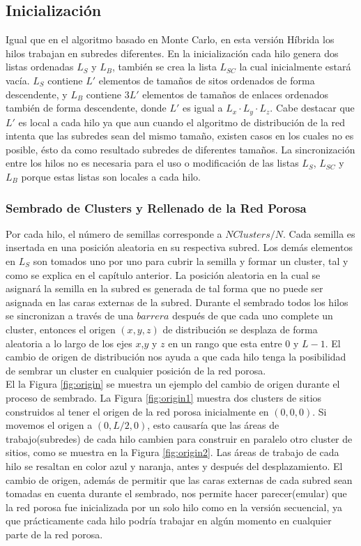 \subsection{Inicialización}
\label{subsec:pinit}
Igual que en el algoritmo basado en Monte Carlo, en esta versión Híbrida los hilos trabajan en subredes diferentes. 
En la inicialización cada hilo genera dos listas ordenadas $L_S$ y $L_B$, también se crea la lista $L_{SC}$ la cual inicialmente estará vacía. 
$L_S$ contiene $L'$ elementos de tamaños de sitos ordenados de forma descendente, y $L_B$ contiene $3L'$ elementos de tamaños de enlaces 
ordenados también de forma descendente, donde $L'$ es igual a $L_x \cdot L_y \cdot L_z$. Cabe destacar que $L'$ es local a cada hilo 
ya que aun cuando el algoritmo de distribución de la red intenta que las subredes sean del mismo tamaño, existen casos en los cuales 
no es posible, ésto da como resultado subredes de diferentes tamaños. La sincronización entre los hilos no es necesaria para 
el uso o modificación de las listas $L_S$, $L_{SC}$ y $L_B$ porque estas listas son locales a cada hilo.

\subsubsection{Sembrado de Clusters y Rellenado de la Red Porosa}
\label{subsec:pseeding}
Por cada hilo, el número de semillas corresponde a $NClusters/N$. Cada semilla es insertada en una posición aleatoria en su 
respectiva subred. Los demás elementos en $L_S$ son tomados uno por uno para cubrir la semilla y formar un cluster, tal y como se 
explica en el capítulo anterior. La posición aleatoria en la cual se asignará la semilla en la subred es generada de tal forma 
que no puede ser asignada en las caras externas de la subred. Durante el sembrado todos los hilos se sincronizan a través 
de una $barrera$ después de que cada uno complete un cluster, entonces el origen $(x, y, z)$ de distribución se desplaza 
de forma aleatoria a lo largo de los ejes $x$,$y$ y $z$ en un rango que esta entre $0$ y $L-1$. 
El cambio de origen de distribución nos ayuda a que cada hilo tenga la posibilidad de sembrar un cluster en cualquier 
posición de la red porosa.\\

El la Figura \ref{fig:origin} se muestra un ejemplo del cambio de origen durante el proceso de sembrado. La Figura \ref{fig:origin1} 
muestra dos clusters de sitios construidos al tener el origen de la red porosa inicialmente en $(0,0,0)$. Si movemos el origen a $(0,L/2,0)$, 
esto causaría que las áreas de trabajo(subredes) de cada hilo cambien para construir en paralelo otro cluster de sitios, 
como se muestra en la Figura \ref{fig:origin2}. Las áreas de trabajo de cada hilo se resaltan en color azul y naranja, antes y después
del desplazamiento. El cambio de origen, adem\'as de permitir que las caras externas de cada subred sean tomadas en 
cuenta durante el sembrado, nos permite hacer parecer(emular) que la red porosa fue inicializada por un solo hilo como en la versión secuencial,
ya que prácticamente cada hilo podría trabajar en algún momento en cualquier parte de la red porosa.\\

